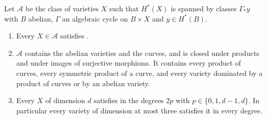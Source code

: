 \begin{proposition}\label{prop:f3prime-known}
Let $\mathcal{A}$ be the class of varieties $X$ such that $H^{*}(X)$ is spanned by classes $\Gamma_{*}y$ with $B$ abelian, $\Gamma$ an algebraic cycle on $B\times X$ and $y\in H^{*}(B)$.
\begin{enumerate}[label=\textup{(\roman*)},leftmargin=2.4em,itemsep=2pt]
\item Every $X\in\mathcal{A}$ satisfies \Fiii{}.
\item $\mathcal{A}$ contains the abelian varieties and the curves, and is closed under products and under images of surjective morphisms. It contains every product of curves, every symmetric product of a curve, and every variety dominated by a product of curves or by an abelian variety.
\item Every $X$ of dimension $d$ satisfies \Fiii{} in the degrees $2p$ with $p\in\{0,1,d-1,d\}$. In particular every variety of dimension at most three satisfies it in every degree.
\end{enumerate}
\end{proposition}


